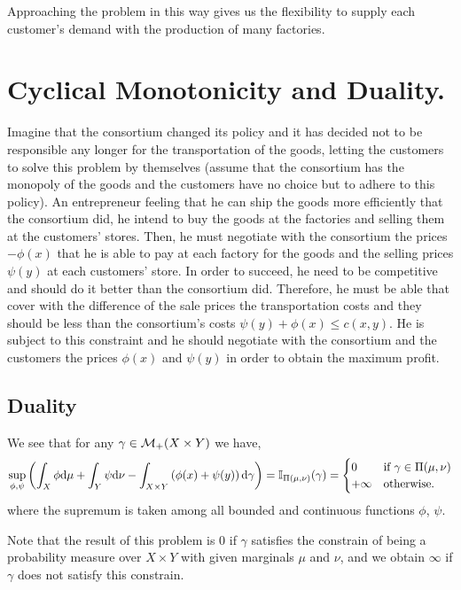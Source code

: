 Approaching the problem in this way gives us the flexibility to supply each customer's demand with the production of many factories.  

\section{Cyclical Monotonicity and Duality.}

Imagine that the consortium changed its policy and it has decided not to be responsible any longer for the transportation of the goods, letting the customers to solve this problem by themselves (assume that the consortium has the monopoly of the goods and the customers have no choice but to adhere to this policy). An entrepreneur feeling that he can ship the goods more efficiently that the consortium did, he intend to buy the goods at the factories and selling them at the customers' stores. Then, he must negotiate with the consortium the prices $-\phi(x)$ that he is able to pay at each factory for the goods and the selling prices $\psi(y)$ at each customers' store. In order to succeed, he need to be competitive and should do it better than the consortium did. Therefore, he must be able that cover with the difference of the sale prices the transportation costs and they should be less than the consortium's costs $\psi(y)+\phi(x)\leq c(x,y)$. He is subject to this constraint and he should negotiate with the consortium and the customers the prices $\phi(x)$ and $\psi(y)$ in order to obtain the maximum profit.


\subsection{Duality}
We see that for any $\gamma \in \mathcal{M}_+(X\times Y)$ we have,
\begin{equation}
\sup_{\phi, \psi} \left( \int_X \phi\mathrm{d}\mu +\int_Y\psi\mathrm{d}\nu-\int_{X\times Y}\left( \phi(x)+\psi(y) \right)\mathrm{d} \gamma \right) = \mathbb{I}_{\Pi(\mu,\nu)}{(\gamma)}=\begin{cases}
0 & \text{if } \gamma \in \Pi(\mu, \nu) \\
+\infty & \text{otherwise}.	
\end{cases}\label{eq: Constrain indicator}
\end{equation}
where the supremum is taken among all bounded and continuous functions $\phi$, $\psi$. 

Note that the result of this problem is $0$ if $\gamma$ satisfies the constrain of being a probability measure over $X\times Y$ with given marginals $\mu$ and $\nu$, and we obtain $\infty$ if $\gamma$ does not satisfy this constrain.

